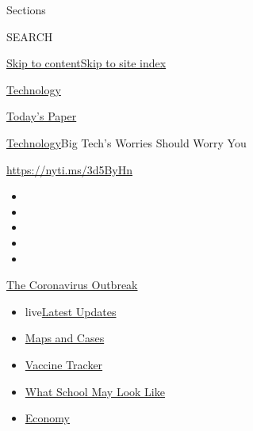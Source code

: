 Sections

SEARCH

\protect\hyperlink{site-content}{Skip to
content}\protect\hyperlink{site-index}{Skip to site index}

\href{https://www.nytimes3xbfgragh.onion/section/technology}{Technology}

\href{https://myaccount.nytimes3xbfgragh.onion/auth/login?response_type=cookie\&client_id=vi}{}

\href{https://www.nytimes3xbfgragh.onion/section/todayspaper}{Today's
Paper}

\href{/section/technology}{Technology}\textbar{}Big Tech's Worries
Should Worry You

\url{https://nyti.ms/3d5ByHn}

\begin{itemize}
\item
\item
\item
\item
\item
\end{itemize}

\href{https://www.nytimes3xbfgragh.onion/news-event/coronavirus?action=click\&pgtype=Article\&state=default\&region=TOP_BANNER\&context=storylines_menu}{The
Coronavirus Outbreak}

\begin{itemize}
\tightlist
\item
  live\href{https://www.nytimes3xbfgragh.onion/2020/08/01/world/coronavirus-covid-19.html?action=click\&pgtype=Article\&state=default\&region=TOP_BANNER\&context=storylines_menu}{Latest
  Updates}
\item
  \href{https://www.nytimes3xbfgragh.onion/interactive/2020/us/coronavirus-us-cases.html?action=click\&pgtype=Article\&state=default\&region=TOP_BANNER\&context=storylines_menu}{Maps
  and Cases}
\item
  \href{https://www.nytimes3xbfgragh.onion/interactive/2020/science/coronavirus-vaccine-tracker.html?action=click\&pgtype=Article\&state=default\&region=TOP_BANNER\&context=storylines_menu}{Vaccine
  Tracker}
\item
  \href{https://www.nytimes3xbfgragh.onion/interactive/2020/07/29/us/schools-reopening-coronavirus.html?action=click\&pgtype=Article\&state=default\&region=TOP_BANNER\&context=storylines_menu}{What
  School May Look Like}
\item
  \href{https://www.nytimes3xbfgragh.onion/live/2020/07/31/business/stock-market-today-coronavirus?action=click\&pgtype=Article\&state=default\&region=TOP_BANNER\&context=storylines_menu}{Economy}
\end{itemize}

